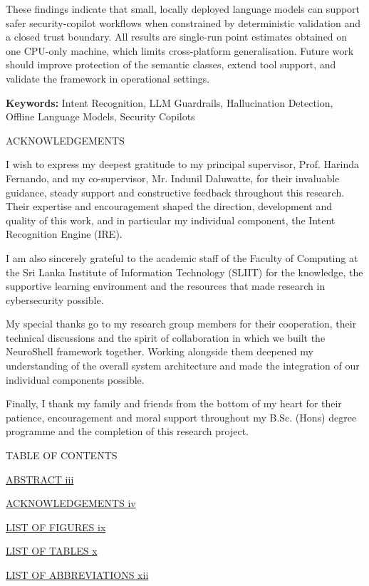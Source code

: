 \documentclass[
]{article}
\begin{document}
These findings indicate that small, locally deployed language models can
support safer security-copilot workflows when constrained by
deterministic validation and a closed trust boundary. All results are
single-run point estimates obtained on one CPU-only machine, which
limits cross-platform generalisation. Future work should improve
protection of the semantic classes, extend tool support, and validate
the framework in operational settings.

\textbf{Keywords:} Intent Recognition, LLM Guardrails, Hallucination
Detection, Offline Language Models, Security Copilots

\protect\hypertarget{_Toc900002}{}{}ACKNOWLEDGEMENTS

I wish to express my deepest gratitude to my principal supervisor, Prof.
Harinda Fernando, and my co-supervisor, Mr. Indunil Daluwatte, for their
invaluable guidance, steady support and constructive feedback throughout
this research. Their expertise and encouragement shaped the direction,
development and quality of this work, and in particular my individual
component, the Intent Recognition Engine (IRE).

I am also sincerely grateful to the academic staff of the Faculty of
Computing at the Sri Lanka Institute of Information Technology (SLIIT)
for the knowledge, the supportive learning environment and the resources
that made research in cybersecurity possible.

My special thanks go to my research group members for their cooperation,
their technical discussions and the spirit of collaboration in which we
built the NeuroShell framework together. Working alongside them deepened
my understanding of the overall system architecture and made the
integration of our individual components possible.

Finally, I thank my family and friends from the bottom of my heart for
their patience, encouragement and moral support throughout my B.Sc.
(Hons) degree programme and the completion of this research project.

TABLE OF CONTENTS

\protect\hyperlink{_Toc900001}{ABSTRACT iii}

\protect\hyperlink{_Toc900002}{ACKNOWLEDGEMENTS iv}

\protect\hyperlink{_Toc900003}{LIST OF FIGURES ix}

\protect\hyperlink{_Toc900004}{LIST OF TABLES x}

\protect\hyperlink{_Toc900005}{LIST OF ABBREVIATIONS xii}
\end{document}
